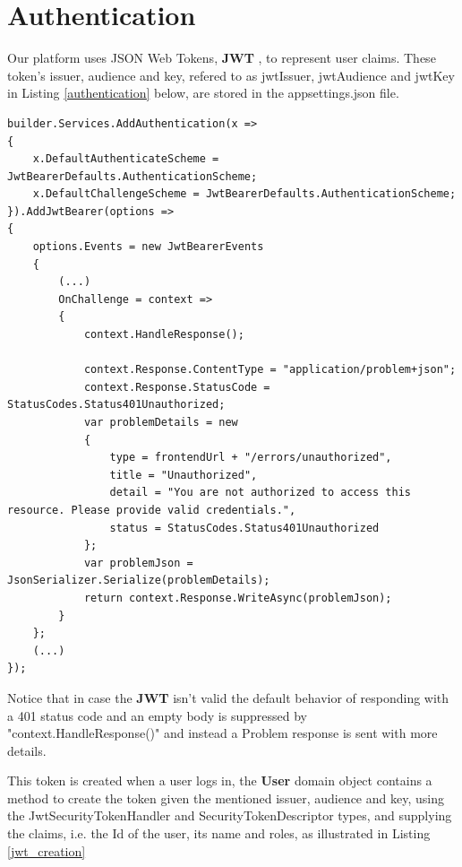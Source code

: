 \newpage

\section{Authentication}

Our platform uses JSON Web Tokens, \textbf{JWT} \cite{rfc7519}, to represent user claims.
These token's issuer, audience and key, refered to as jwtIssuer, jwtAudience and jwtKey in Listing \ref{authentication} below, are stored in the appsettings.json file.

\begin{lstlisting}[style=sharpc, caption={Custom JWT Authentication Middleware in ASP.NET Core: Handling Unauthorized Access with Detailed Problem Responses.}, label={authentication}] 
builder.Services.AddAuthentication(x =>
{
	x.DefaultAuthenticateScheme = JwtBearerDefaults.AuthenticationScheme;
	x.DefaultChallengeScheme = JwtBearerDefaults.AuthenticationScheme;
}).AddJwtBearer(options =>
{
	options.Events = new JwtBearerEvents
	{
		(...)
		OnChallenge = context =>
		{
			context.HandleResponse();
			
			context.Response.ContentType = "application/problem+json";
			context.Response.StatusCode = StatusCodes.Status401Unauthorized;
			var problemDetails = new
			{
				type = frontendUrl + "/errors/unauthorized",
				title = "Unauthorized",
				detail = "You are not authorized to access this resource. Please provide valid credentials.",
				status = StatusCodes.Status401Unauthorized
			};
			var problemJson = JsonSerializer.Serialize(problemDetails);
			return context.Response.WriteAsync(problemJson);
		}
	};
	(...)
});
\end{lstlisting}

Notice that in case the \textbf{JWT} isn't valid the default behavior of responding with a 401 status code and an empty body is suppressed by "context.HandleResponse()" and instead a Problem response is sent with more details.

This token is created when a user logs in, the \textbf{User} domain object contains a method to create the token given the mentioned issuer, audience and key, using the JwtSecurityTokenHandler and SecurityTokenDescriptor types, and supplying the claims, i.e. the Id of the user, its name and roles, as illustrated in Listing \ref{jwt_creation}

